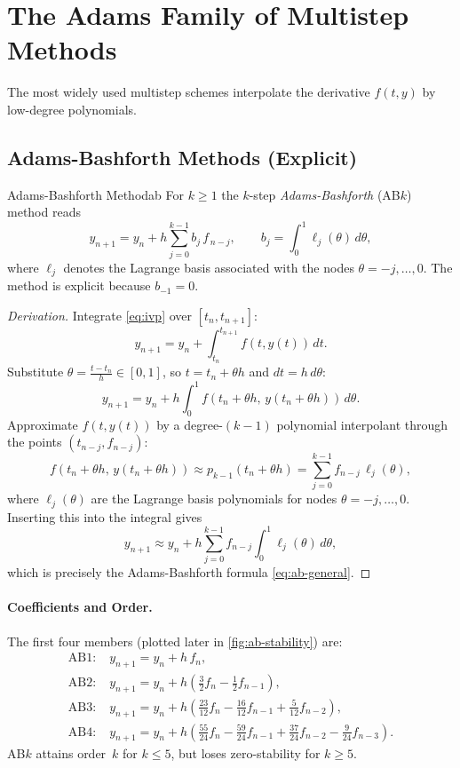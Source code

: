 \section{The Adams Family of Multistep Methods}
\label{sec:adams-family}
The most widely used multistep schemes interpolate the derivative $f(t,y)$ by low-degree polynomials.

\subsection{Adams-Bashforth Methods (Explicit)}
\label{sec:ab}
\begin{definition}{Adams-Bashforth Method}{ab}
  For $k\ge1$ the $k$-step \emph{Adams-Bashforth} (AB$k$) method reads
  \begin{equation}
    y_{n+1}=y_n + h\sum_{j=0}^{k-1}b_j\,f_{\,n-j}, \qquad b_j= \int_{0}^{1}\ell_j(\theta)\,d\theta,
    \label{eq:ab-general}
  \end{equation}
  where $\ell_j$ denotes the Lagrange basis associated with the nodes
  $\theta=-j,\dots,0$.  The method is explicit because $b_{-1}=0$.
\end{definition}

\begin{proof}[Derivation]
  Integrate \eqref{eq:ivp} over $[t_n, t_{n+1}]$:
  \[
    y_{n+1} = y_n + \int_{t_n}^{t_{n+1}} f(t, y(t))\,dt.
  \]
  Substitute $\theta = \frac{t - t_n}{h} \in [0, 1]$, so $t = t_n + \theta h$ and $dt = h\,d\theta$:
  \[
    y_{n+1} = y_n + h \int_{0}^{1} f(t_n + \theta h,\, y(t_n + \theta h))\,d\theta.
  \]
  Approximate $f(t, y(t))$ by a degree-$(k-1)$ polynomial interpolant through the points $(t_{n-j}, f_{n-j})$:
  \[
    f(t_n + \theta h,\, y(t_n + \theta h)) \approx p_{k-1}(t_n + \theta h) = \sum_{j=0}^{k-1} f_{n-j}\, \ell_j(\theta),
  \]
  where $\ell_j(\theta)$ are the Lagrange basis polynomials for nodes $\theta = -j, \ldots, 0$.
  Inserting this into the integral gives
  \[
    y_{n+1} \approx y_n + h \sum_{j=0}^{k-1} f_{n-j} \int_{0}^{1} \ell_j(\theta)\, d\theta,
  \]
  which is precisely the Adams-Bashforth formula \eqref{eq:ab-general}.
\end{proof}


\paragraph{Coefficients and Order.}
The first four members (plotted later in
\autoref{fig:ab-stability}) are:
\begin{align*}
  \text{AB1:} & \; y_{n+1}=y_n+h\,f_n,                                      \\
  \text{AB2:} & \; y_{n+1}=y_n+h\!\left(\frac32 f_n-\frac12 f_{n-1}\right), \\
  \text{AB3:} & \; y_{n+1}=y_n+h\!\left(\frac{23}{12} f_n
  -\frac{16}{12} f_{n-1}
  +\frac{5}{12}  f_{n-2}\right),                                            \\
  \text{AB4:} & \; y_{n+1}=y_n+h\!\left(\frac{55}{24} f_n
  -\frac{59}{24} f_{n-1}
  +\frac{37}{24} f_{n-2}
  -\frac{9}{24}  f_{n-3}\right).
\end{align*}
AB$k$ attains order~$k$ for $k\le5$, but loses zero-stability for
$k\ge5$.

